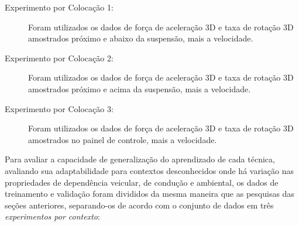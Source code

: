 \begin{description}
	
	\item[Experimento por Colocação 1:] Foram utilizados os dados de força de aceleração 3D e taxa de rotação 3D amostrados próximo e abaixo da suspensão, mais a velocidade.
    
    \item[Experimento por Colocação 2:] Foram utilizados os dados de força de aceleração 3D e taxa de rotação 3D amostrados próximo e acima da suspensão, mais a velocidade.
    
    \item[Experimento por Colocação 3:] Foram utilizados os dados de força de aceleração 3D e taxa de rotação 3D amostrados no painel de controle, mais a velocidade.
    
\end{description}

Para avaliar a capacidade de generalização do aprendizado de cada técnica, avaliando sua adaptabilidade para contextos desconhecidos onde há variação nas propriedades de dependência veicular, de condução e ambiental, os dados de treinamento e validação foram divididos da mesma maneira que as pesquisas das seções anteriores, separando-os de acordo com o conjunto de dados em três \emph{experimentos por contexto}:

